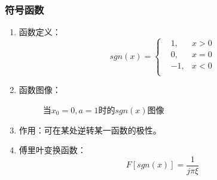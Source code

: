 \documentclass[twocolumn]{ctexart}
\begin{document}
\subsubsection{符号函数}
\begin{enumerate}
    \item
          函数定义：
          \begin{equation}
              sgn\left(x\right)=\left\{
              \begin{aligned}
                   & 1,  & x>0 \\
                   & 0,  & x=0 \\
                   & -1, & x<0 \\
              \end{aligned}
              \right.
              \nonumber
          \end{equation}
    \item
          函数图像：
          \begin{figure}[H]
              \caption{当$x_0=0,a=1$时的$sgn\left(x\right)$图像}
          \end{figure}
    \item
          作用：可在某处逆转某一函数的极性。
    \item
          傅里叶变换函数：
          \begin{equation}
              F\left[ sgn\left(x\right) \right]=\frac{1}{j\pi\xi}
              \nonumber
          \end{equation}
\end{enumerate}
\end{document}
